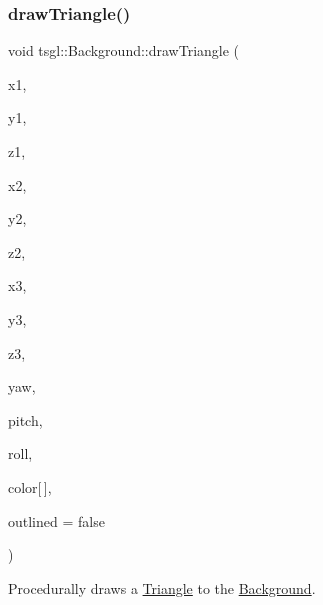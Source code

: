 \subsubsection{\texorpdfstring{draw\+Triangle()}{drawTriangle()}\hspace{0.1cm}{\footnotesize\ttfamily [2/2]}}
{\footnotesize\ttfamily void tsgl\+::\+Background\+::draw\+Triangle (\begin{DoxyParamCaption}\item[{float}]{x1,  }\item[{float}]{y1,  }\item[{float}]{z1,  }\item[{float}]{x2,  }\item[{float}]{y2,  }\item[{float}]{z2,  }\item[{float}]{x3,  }\item[{float}]{y3,  }\item[{float}]{z3,  }\item[{float}]{yaw,  }\item[{float}]{pitch,  }\item[{float}]{roll,  }\item[{\hyperlink{structtsgl_1_1_color_float}{Color\+Float}}]{color\mbox{[}$\,$\mbox{]},  }\item[{bool}]{outlined = {\ttfamily false} }\end{DoxyParamCaption})\hspace{0.3cm}{\ttfamily [virtual]}}



Procedurally draws a \hyperlink{classtsgl_1_1_triangle}{Triangle} to the \hyperlink{classtsgl_1_1_background}{Background}. 

